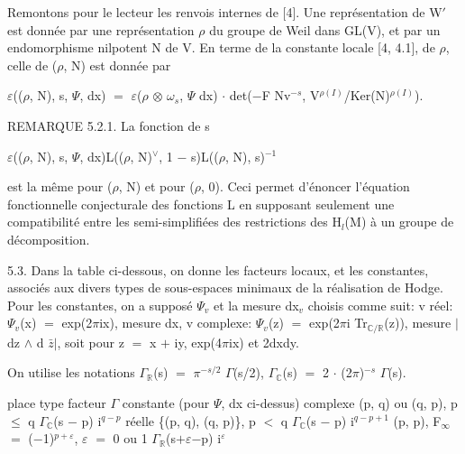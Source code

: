 \documentclass[10pt,twoside]{article}
\begin{document}
Remontons pour le lecteur les renvois internes de [4]. Une représentation de W\ensuremath{′} est donnée par une représentation \ensuremath{ρ} du groupe de Weil dans GL(V), et par un endomorphisme nilpotent N de V. En terme de la constante locale [4, 4.1], de \ensuremath{ρ}, celle de (\ensuremath{ρ}, N) est donnée par\par
\ensuremath{ε}((\ensuremath{ρ}, N), s, \ensuremath{Ψ}, dx) \ensuremath{=} \ensuremath{ε}(\ensuremath{ρ} \ensuremath{⊗} \ensuremath{ω}\ensuremath{_{s}}, \ensuremath{Ψ} dx) \ensuremath{·} det(\ensuremath{−}F Nv\ensuremath{^{−s}}, V\ensuremath{^{ρ(I)}}/Ker(N)\ensuremath{^{ρ(I)}}).\par
REMARQUE 5.2.1. La fonction de s\par
\ensuremath{ε}((\ensuremath{ρ}, N), s, \ensuremath{Ψ}, dx)L((\ensuremath{ρ}, N)\ensuremath{^{∨}}, 1 \ensuremath{−} s)L((\ensuremath{ρ}, N), s)\ensuremath{^{-1}}\par
est la même pour (\ensuremath{ρ}, N) et pour (\ensuremath{ρ}, 0). Ceci permet d’énoncer l’équation fonctionnelle conjecturale des fonctions L en supposant seulement une compatibilité entre les semi-simplifiées des restrictions des H\ensuremath{_{l}}(M) à un groupe de décomposition.\par
5.3. Dans la table ci-dessous, on donne les facteurs locaux, et les constantes, associés aux divers types de sous-espaces minimaux de la réalisation de Hodge. Pour les constantes, on a supposé \ensuremath{Ψ}\ensuremath{_{v}} et la mesure dx\ensuremath{_{v}} choisis comme suit: v réel: \ensuremath{Ψ}\ensuremath{_{v}}(x) \ensuremath{=} exp(2\ensuremath{π}ix), mesure dx, v complexe: \ensuremath{Ψ}\ensuremath{_{v}}(z) \ensuremath{=} exp(2\ensuremath{π}i Tr\ensuremath{_{ℂ/ℝ}}(z)), mesure \ensuremath{|}dz \ensuremath{∧} d \ensuremath{\bar{z}}\ensuremath{|}, soit pour z \ensuremath{=} x \ensuremath{+} iy, exp(4\ensuremath{π}ix) et 2dxdy.\par
On utilise les notations \ensuremath{Γ}\ensuremath{_{ℝ}}(s) \ensuremath{=} \ensuremath{π}\ensuremath{^{−s/2}} \ensuremath{Γ}(s/2), \ensuremath{Γ}\ensuremath{_{ℂ}}(s) \ensuremath{=} 2 \ensuremath{·} (2\ensuremath{π})\ensuremath{^{−s}} \ensuremath{Γ}(s).\par
place       type                                      facteur \ensuremath{Γ}        constante (pour \ensuremath{Ψ}, dx ci-dessus) complexe    (p, q) ou (q, p), p \ensuremath{≤} q                   \ensuremath{Γ}\ensuremath{_{ℂ}}(s \ensuremath{−} p)       i\ensuremath{^{q−p}} réelle      \{(p, q), (q, p)\}, p \ensuremath{<} q                   \ensuremath{Γ}\ensuremath{_{ℂ}}(s \ensuremath{−} p)       i\ensuremath{^{q−p+1}} (p, p), F\ensuremath{_{∞}} \ensuremath{=} (\ensuremath{−}1)\ensuremath{^{p+ε}}, \ensuremath{ε} \ensuremath{=} 0 ou 1     \ensuremath{Γ}\ensuremath{_{ℝ}}(s\ensuremath{+}\ensuremath{ε}\ensuremath{−}p)       i\ensuremath{^{ε}}\par
\end{document}
